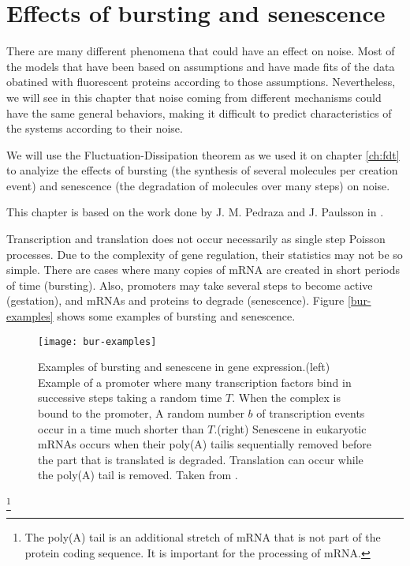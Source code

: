 \chapter{Effects of bursting and senescence}

There are many different phenomena that could have an effect on noise. Most of the models that have been based on assumptions and have made fits of the data obatined with fluorescent proteins according to those assumptions. Nevertheless, we will see in this chapter that noise coming from different mechanisms could have the same general behaviors, making it difficult to predict characteristics of the systems according to their noise.

We will use the Fluctuation-Dissipation theorem as we used it on chapter \ref{ch:fdt} to analyize the effects of bursting (the synthesis of several molecules per creation event) and senescence (the degradation of molecules over many steps) on noise.

This chapter is based on the work done by J. M. Pedraza and J. Paulsson in \cite{pedraza08}.

Transcription and translation does not occur necessarily as single step Poisson processes. Due to the complexity of gene regulation, their statistics may not be so simple. There are cases where many copies of mRNA are created in short periods of time (bursting). Also, promoters may take several steps to become active (gestation), and mRNAs and proteins to degrade (senescence). Figure \ref{bur-examples} shows some examples of bursting and senescence.

\begin{figure}[H]
  \centering
  \texttt{[image: bur-examples]}
  \caption[Examples of bursting and senescence in gene expression]{\label{fig:bur-examples} Examples of bursting and senescene in gene expression.(left) Example of a promoter where many transcription factors bind in successive steps taking a random time $T$. When the complex is bound to the promoter, A random number $b$ of transcription events occur in a time much shorter than $T$.(right) Senescene in eukaryotic mRNAs occurs when their poly(A) tail\footnotemark is sequentially removed before the part that is translated is degraded. Translation can occur while the poly(A) tail is removed. Taken from \cite{pedraza08}.}
\end{figure}

\footnote{The poly(A) tail is an additional stretch of mRNA that is not part of the protein coding sequence. It is important for the processing of mRNA.}

